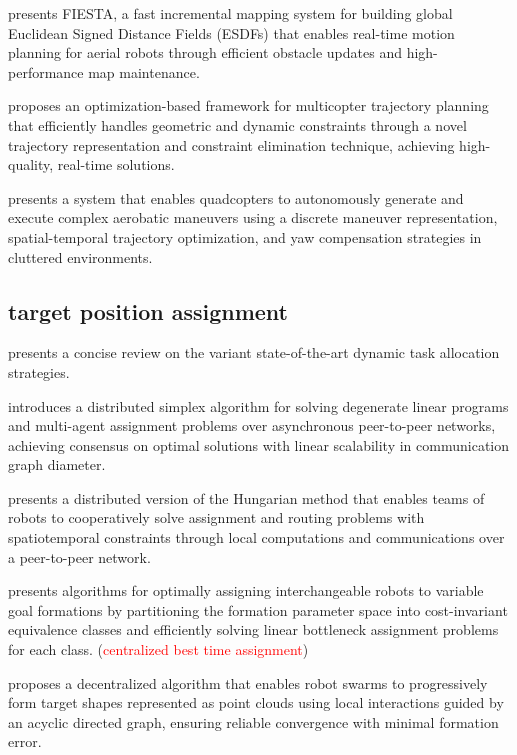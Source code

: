 \cite{han2019fiesta} presents FIESTA, a fast incremental mapping system for building global Euclidean Signed Distance Fields (ESDFs) that enables real-time motion planning for aerial robots through efficient obstacle updates and high-performance map maintenance.

\cite{wang2022geometrically} proposes an optimization-based framework for multicopter trajectory planning that efficiently handles geometric and dynamic constraints through a novel trajectory representation and constraint elimination technique, achieving high-quality, real-time solutions.

\cite{wang2025unlocking} presents a system that enables quadcopters to autonomously generate and execute complex aerobatic maneuvers using a discrete maneuver representation, spatial-temporal trajectory optimization, and yaw compensation strategies in cluttered environments.


\subsection{target position assignment}

\cite{rm2020review} presents a concise review on the variant state-of-the-art dynamic task allocation strategies.

\cite{burger2012distributed} introduces a distributed simplex algorithm for solving degenerate linear programs and multi-agent assignment problems over asynchronous peer-to-peer networks, achieving consensus on optimal solutions with linear scalability in communication graph diameter.

\cite{chopra2017distributed} presents a distributed version of the Hungarian method that enables teams of robots to cooperatively solve assignment and routing problems with spatiotemporal constraints through local computations and communications over a peer-to-peer network.

\cite{akella2020assignment} presents algorithms for optimally assigning interchangeable robots to variable goal formations by partitioning the formation parameter space into cost-invariant equivalence classes and efficiently solving linear bottleneck assignment problems for each class. (\textcolor{red}{centralized best time assignment})

\cite{li2019decentralized} proposes a decentralized algorithm that enables robot swarms to progressively form target shapes represented as point clouds using local interactions guided by an acyclic directed graph, ensuring reliable convergence with minimal formation error.

